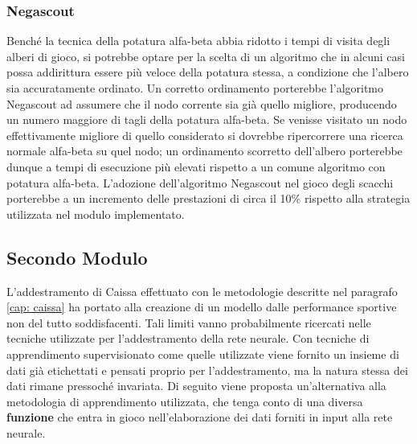 \subsubsection{Negascout}
Benché la tecnica della potatura alfa-beta abbia ridotto i tempi di visita degli alberi di gioco, si potrebbe optare per la scelta di un algoritmo che in alcuni casi possa addirittura essere più veloce della potatura stessa, a condizione che l'albero sia accuratamente ordinato. Un corretto ordinamento porterebbe l'algoritmo Negascout ad assumere che il nodo corrente sia già quello migliore, producendo un numero maggiore di tagli della potatura alfa-beta. Se venisse visitato un nodo effettivamente migliore di quello considerato si dovrebbe ripercorrere una ricerca normale alfa-beta su quel nodo; un ordinamento scorretto dell'albero porterebbe dunque a tempi di esecuzione più elevati rispetto a un comune algoritmo con potatura alfa-beta. L'adozione dell'algoritmo Negascout nel gioco degli scacchi porterebbe a un incremento delle prestazioni di circa il 10\%\cite{reinefeld1983improvement} rispetto alla strategia utilizzata nel modulo implementato.
\subsection{Secondo Modulo}
L'addestramento di Caissa effettuato con le metodologie descritte nel paragrafo \ref{cap: caissa} ha portato alla creazione di un modello dalle performance sportive non del tutto soddisfacenti. Tali limiti vanno probabilmente ricercati nelle tecniche utilizzate per l'addestramento della rete neurale. Con tecniche di apprendimento supervisionato come quelle utilizzate viene fornito un insieme di dati già etichettati e pensati proprio per l'addestramento, ma la natura stessa dei dati rimane pressoché invariata. Di seguito viene proposta un'alternativa alla metodologia di apprendimento utilizzata, che tenga conto di una diversa \textbf{funzione} che entra in gioco nell'elaborazione dei dati forniti in input alla rete neurale.
